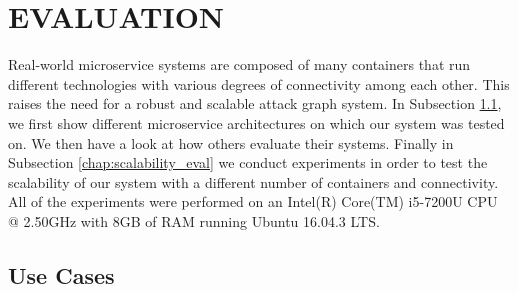 
\section{EVALUATION}
\label{chap:eval}

Real-world microservice systems are composed of many containers that run different technologies with various degrees of connectivity among each other. This raises the need for a robust and scalable attack graph system. In Subsection \ref{chap:heterogenious_systems}, we first show different microservice architectures on which our system was tested on. We then have a look at how others evaluate their systems. Finally in Subsection \ref{chap:scalability_eval} we conduct experiments in order to test the scalability of our system with a different number of containers and connectivity. All of the experiments were performed on an Intel(R) Core(TM) i5-7200U CPU @ 2.50GHz with 8GB of RAM running Ubuntu 16.04.3 LTS.

\subsection{Use Cases}
\label{chap:heterogenious_systems}

